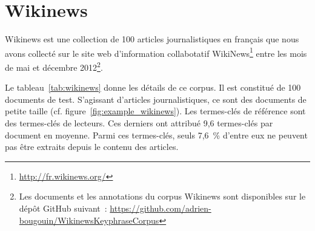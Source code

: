 
  \section[Wikinews]{Wikinews~\textnormal{\large\cite{bougouin2013topicrank}}}
  \label{sec:main-data_description-wikinews_data}
    Wikinews est une collection de 100 articles journalistiques en français
    que nous avons collecté sur le site web d'information collabotatif
    WikiNews\footnote{\url{http://fr.wikinews.org/}} entre les mois de mai et
    décembre 2012\footnote{Les documents et les annotations du corpus Wikinews
    sont disponibles sur le dépôt GitHub suivant~:
    \url{https://github.com/adrien-bougouin/WikinewsKeyphraseCorpus}}.
    
    Le tableau~\ref{tab:wikinews} donne les détails de ce corpus. Il est
    constitué de 100 documents de test. S'agissant d'articles journalistiques,
    ce sont des documents de petite taille (cf.
    figure~\ref{fig:example_wikinews}). Les termes-clés de référence sont des
    termes-clés de lecteurs. Ces derniers ont attribué 9,6 termes-clés par
    document en moyenne. Parmi ces termes-clés, seuls 7,6~\% d'entre eux ne
    peuvent pas être extraits depuis le contenu des articles.

    \begin{table}[!h]
      \centering

      \caption{Corpus Wikinews
               \label{tab:wikinews}}
    \end{table}

